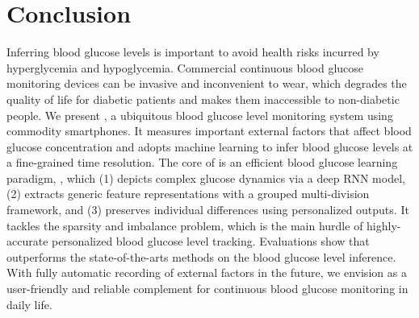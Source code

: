 
\section{Conclusion}
\label{sec:conclusion}
Inferring blood glucose levels is important to avoid health risks incurred by hyperglycemia and hypoglycemia.
Commercial continuous blood glucose monitoring devices can be invasive and inconvenient to wear, which degrades the quality of life for diabetic patients and makes them inaccessible to non-diabetic people.
We present \sysname, a ubiquitous blood glucose level monitoring system using commodity smartphones.
It measures important external factors that affect blood glucose concentration and adopts machine learning to infer blood glucose levels at a fine-grained time resolution.
The core of \sysname is an efficient blood glucose learning paradigm, \modelname, which (1) depicts complex glucose dynamics via a deep RNN model, (2) extracts generic feature representations with a grouped multi-division framework, and (3) preserves individual differences using personalized outputs.
It tackles the sparsity and imbalance problem, which is the main hurdle of highly-accurate personalized blood glucose level tracking.
Evaluations show that \modelname outperforms the state-of-the-arts methods on the blood glucose level inference.
With fully automatic recording of external factors in the future, we envision \sysname as a user-friendly and reliable complement for continuous blood glucose monitoring in daily life.

